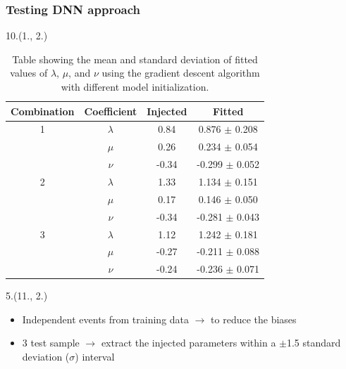 \documentclass[12pt, xcolor={dvipsnames}, aspectratio = 169, sans,mathserif]{beamer}
\newenvironment{List}[2]
{\begin{textblock}{#1}#2
\begin{itemize}}
{\end{itemize}
\end{textblock}}
\begin{document}
\begin{frame}
\frametitle{Testing DNN approach}

\begin{textblock}{10.}(1., 2.)
\begin{center}
\begin{table}
\begin{tabular}{ |c| c| c| c| }
\hline
Combination & Coefficient & Injected & Fitted \\
\hline
1           & $\lambda$   & 0.84      & 0.876 $\pm$ 0.208 \\
            & $\mu$       & 0.26      & 0.234 $\pm$ 0.054 \\
            & $\nu$       & -0.34      & -0.299 $\pm$ 0.052 \\
\hline
2           & $\lambda$   & 1.33      & 1.134 $\pm$ 0.151 \\
            & $\mu$       & 0.17      & 0.146 $\pm$ 0.050 \\
            & $\nu$       & -0.34      & -0.281 $\pm$ 0.043 \\
\hline
3           & $\lambda$   & 1.12      & 1.242 $\pm$ 0.181 \\
            & $\mu$       & -0.27      & -0.211 $\pm$ 0.088 \\
            & $\nu$       & -0.24      & -0.236 $\pm$ 0.071 \\
\hline

\end{tabular}
  \caption{Table showing the mean and standard deviation of fitted values of $\lambda$, $\mu$, and $\nu$ using the gradient descent algorithm with different model initialization.}
  \label{tabel:1}
\end{table}
\end{center}
\end{textblock}

\begin{List}{5.}{(11., 2.)}
  \item Independent events from training data $\rightarrow$ to reduce the biases

  \item 3 test sample $\rightarrow$ extract the injected parameters within a $\pm$1.5 standard deviation ($\sigma$) interval
\end{List}

\end{frame}
\end{document}
